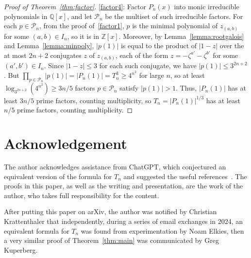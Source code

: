 \documentclass{article}
\begin{document}
\begin{proof}[Proof of Theorem~\ref{thm:factor}]
\ref{factor4}: Factor $P_n(x)$ into monic irreducible polynomials in $\mathbb{Q}[x]$, and let $\mathcal{P}_n$ be the multiset of such irreducible factors. For each $p\in\mathcal{P}_n$, from the proof of~\ref{factor1}, $p$ is the minimal polynomial of $z_{(a,b)}$ for some $(a,b)\in I_n$, so it is in $\mathbb{Z}[x]$. Moreover, by Lemma~\ref{lemma:rootgalois} and Lemma~\ref{lemma:minpoly}, $|p(1)|$ is equal to the product of $|1-z|$ over the at most $2n+2$ conjugates $z$ of $z_{(a,b)}$, each of the form $z=-\zeta^{a'}-\zeta^{b'}$ for some $(a',b')\in I_n$. Since $|1-z|\leq 3$ for each such conjugate, we have $|p(1)|\leq 3^{2n+2}$. But $\prod_{p\in \mathcal{P}_n}|p(1)|=|P_n(1)|=T_n^3\geq 4^{n^2}$ for large $n$, so at least $\log_{3^{2n+2}}(4^{n^2})\geq 3n/5$ factors $p\in \mathcal{P}_n$ satisfy $|p(1)|>1$. Thus, $|P_n(1)|$ has at least $3n/5$ prime factors, counting multiplicity, so $T_n=|P_n(1)|^{1/3}$ has at least $n/5$ prime factors, counting multiplicity.
\end{proof} 

\section*{Acknowledgement}
The author acknowledges assistance from ChatGPT, which conjectured an equivalent version of the formula for $T_n$ and suggested the useful references~\cite{KPW,S}. The proofs in this paper, as well as the writing and presentation, are the work of the author, who takes full responsibility for the content. 

After putting this paper on arXiv, the author was notified by Christian Krattenthaler that independently, during a series of email exchanges in 2024, an equivalent formula for $T_n$ was found from experimentation by Noam Elkies, then a very similar proof of Theorem~\ref{thm:main} was communicated by Greg Kuperberg.




\end{document}

